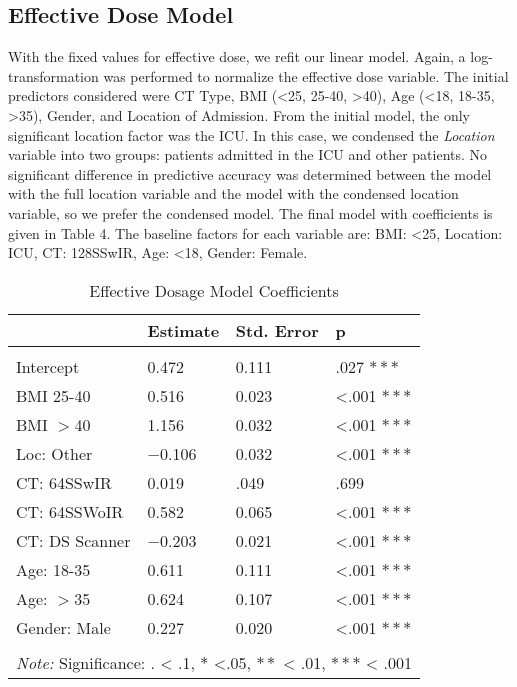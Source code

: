 \documentclass[]{article}
\begin{document}
\subsection{Effective Dose Model}\label{effective-dose-model}

With the fixed values for effective dose, we refit our linear model.
Again, a log-transformation was performed to normalize the effective
dose variable. The initial predictors considered were CT Type, BMI
(\textless{}25, 25-40, \textgreater{}40), Age (\textless{}18, 18-35,
\textgreater{}35), Gender, and Location of Admission. From the initial
model, the only significant location factor was the ICU. In this case,
we condensed the \textit{Location} variable into two groups: patients
admitted in the ICU and other patients. No significant difference in
predictive accuracy was determined between the model with the full
location variable and the model with the condensed location variable, so
we prefer the condensed model. The final model with coefficients is
given in Table 4. The baseline factors for each variable are: BMI:
\textless{}25, Location: ICU, CT: 128SSwIR, Age: \textless{}18, Gender:
Female.

\begin{table}[H] \centering 
  \caption{Effective Dosage Model Coefficients} 
\begin{tabular}{p{3cm}|p{3cm}p{3cm}p{3cm}}
\\[-1.8ex] \hline 
\hline
    & Estimate & Std. Error & p  \\
\hline \\[-1.8ex] 
 Intercept   & 0.472 & 0.111 & .027 $***$ \\
 BMI 25-40   & 0.516 & 0.023 & <.001 $***$\\
 BMI $>$40   & 1.156 & 0.032 & <.001 $***$\\
 Loc: Other  & $-$0.106 & 0.032 & <.001 $***$\\
 CT: 64SSwIR & 0.019 & .049 & .699  \\
 CT: 64SSWoIR & 0.582 & 0.065 & <.001 $***$ \\
 CT: DS Scanner &$-$0.203 & 0.021 & <.001 $***$ \\
 Age: 18-35 & 0.611 & 0.111 & <.001 $***$\\
 Age: $>$35 & 0.624 & 0.107 & <.001 $***$ \\
 Gender: Male & 0.227 & 0.020 & <.001 $***$ \\
\hline 
\hline \\[-1.8ex]
\multicolumn{4}{l}{\textit{Note:} Significance: $.$ < .1, $*$ <.05, $**$ < .01, $***$ < .001}
 \end{tabular}
\end{table}
\end{document}
